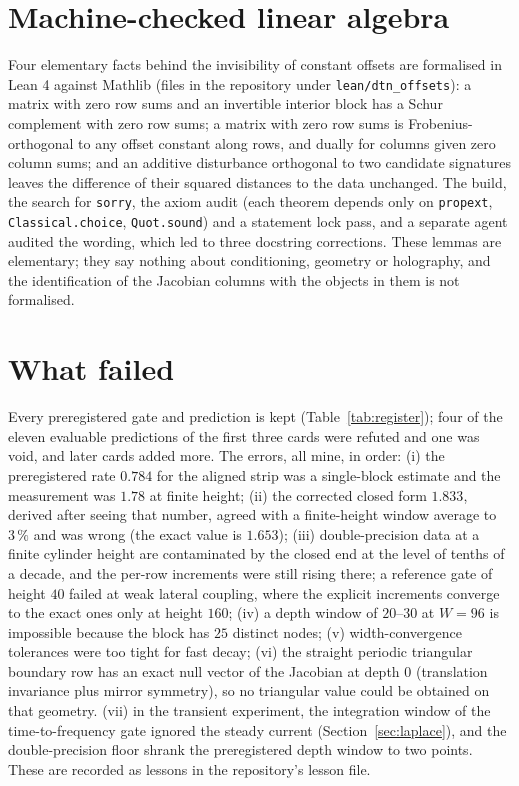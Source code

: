 \documentclass[11pt,a4paper]{article}
\begin{document}
\section{Machine-checked linear algebra}\label{sec:lean}
Four elementary facts behind the invisibility of constant offsets are formalised in Lean 4 against Mathlib (files in the repository under \texttt{lean/dtn\_offsets}): a matrix with zero row sums and an invertible
interior block has a Schur complement with zero row sums; a matrix with zero row sums is Frobenius-orthogonal to any offset constant along rows, and dually for columns given zero column sums;
and an additive disturbance orthogonal to two candidate signatures leaves the difference of their squared distances to the data unchanged. The build, the search for \texttt{sorry}, the axiom audit
(each theorem depends only on \texttt{propext}, \texttt{Classical.choice}, \texttt{Quot.sound}) and a statement lock pass, and a separate agent audited the wording, which led to three docstring corrections.
These lemmas are elementary; they say nothing about conditioning, geometry or holography, and the identification of the Jacobian columns with the objects in them is not formalised.

\section{What failed}\label{sec:failures}
Every preregistered gate and prediction is kept (Table~\ref{tab:register}); four of the eleven evaluable predictions of the first three
cards were refuted and one was void, and later cards added more. The errors, all mine, in order:
(i) the preregistered rate $0.784$ for the aligned strip was a single-block estimate and the measurement was $1.78$ at finite height;
(ii) the corrected closed form $1.833$, derived after seeing that number, agreed with a finite-height window average to $3\,\%$
and was wrong (the exact value is $1.653$); (iii) double-precision data at a finite cylinder height are contaminated by the closed
end at the level of tenths of a decade, and the per-row increments were still rising there; a reference gate of height $40$
failed at weak lateral coupling, where the explicit increments converge to the exact ones only at height $160$; (iv) a depth window
of $20$--$30$ at $W=96$ is impossible because the block has $25$ distinct nodes; (v) width-convergence tolerances were too tight for
fast decay; (vi) the straight periodic triangular boundary row has an exact null vector of the Jacobian at depth $0$ (translation
invariance plus mirror symmetry), so no triangular value could be obtained on that geometry. (vii) in the transient experiment, the integration window of the time-to-frequency gate ignored the steady current (Section~\ref{sec:laplace}), and the double-precision floor shrank the preregistered depth window to two points. These are recorded as lessons
in the repository's lesson file.
\end{document}
